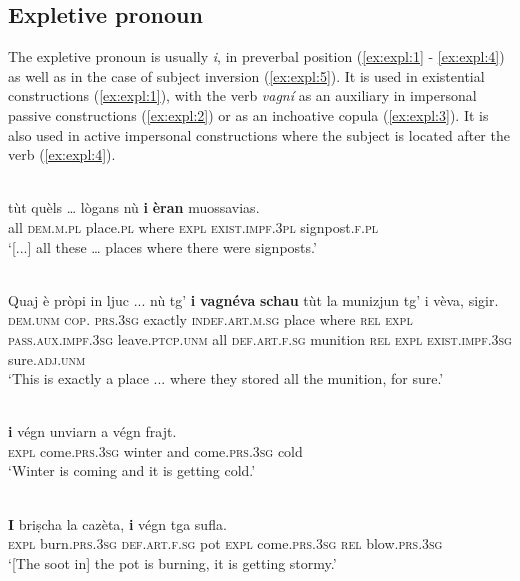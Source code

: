 \subsection{Expletive pronoun} 
 The expletive pronoun is usually \textit{i}, in preverbal position (\ref{ex:expl:1} - \ref{ex:expl:4}) as well as in the case of subject inversion (\ref{ex:expl:5}). It is used in existential constructions (\ref{ex:expl:1}), with the verb \textit{vagní} as an auxiliary in impersonal passive constructions (\ref{ex:expl:2}) or as an inchoative copula (\ref{ex:expl:3}). It is also used in active impersonal constructions where the subject is located after the verb (\ref{ex:expl:4}). 
 
 \ea\label{ex:expl:1}
 \\ 
 \gll [...] tùt quèls … lògans nù \textbf{i} \textbf{èran} muossavias.   \\
 {} all \textsc{dem.m.pl} {} place.\textsc{pl} where \textsc{expl} \textsc{exist.impf.3pl} signpost.\textsc{f.pl}\\
\glt `[...] all these … places where there were signposts.'
 \z
 
 \ea\label{ex:expl:2}
 \\ 
 \gll  Quaj è pròpi in ljuc ... nù tg’ \textbf{i} \textbf{vagnéva} \textbf{schau} tùt la munizjun tg’ i vèva, sigir.\\
 \textsc{dem.unm} \textsc{cop. prs.3sg} exactly \textsc{indef.art.m.sg} place {} where \textsc{rel} \textsc{expl} \textsc{pass.aux.impf.3sg} leave.\textsc{ptcp.unm} all \textsc{def.art.f.sg} munition \textsc{rel} \textsc{expl} \textsc{exist.impf.3sg} sure.\textsc{adj.unm}\\
\glt `This is exactly a place ... where they stored all the munition, for sure.'
\z
 
\ea\label{ex:expl:3}
\\
\gll […] \textbf{i} végn unviarn a végn frajt. \\
     {} \textsc{expl} come.\textsc{prs.3sg} winter and come.\textsc{prs.3sg} cold \\
\glt `Winter is coming and it is getting cold.'
\z

\ea\label{ex:expl:4}
\\
\gll \textbf{I} briṣcha la cazèta, \textbf{i} végn tga sufla. \\
   \textsc{expl} burn.\textsc{prs.3sg} \textsc{def.art.f.sg} pot \textsc{expl} come.\textsc{prs.3sg} \textsc{rel} blow.\textsc{prs.3sg} \\
\glt `[The soot in] the pot is burning, it is getting stormy.'
\z


